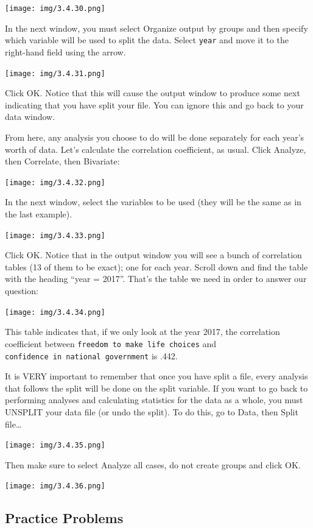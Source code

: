 \documentclass[]{book}
\begin{document}
\texttt{[image: img/3.4.30.png]}

In the next window, you must select {Organize output by groups} and then
specify which variable will be used to split the data. Select
\texttt{year} and move it to the right-hand field using the arrow.

\texttt{[image: img/3.4.31.png]}

Click {OK}. Notice that this will cause the output window to produce
some next indicating that you have split your file. You can ignore this
and go back to your data window.

From here, any analysis you choose to do will be done separately for
each year's worth of data. Let's calculate the correlation coefficient,
as usual. Click {Analyze}, then {Correlate}, then {Bivariate}:

\texttt{[image: img/3.4.32.png]}

In the next window, select the variables to be used (they will be the
same as in the last example).

\texttt{[image: img/3.4.33.png]}

Click {OK}. Notice that in the output window you will see a bunch of
correlation tables (13 of them to be exact); one for each year. Scroll
down and find the table with the heading ``year = 2017''. That's the
table we need in order to answer our question:

\texttt{[image: img/3.4.34.png]}

This table indicates that, if we only look at the year 2017, the
correlation coefficient between
\texttt{freedom\ to\ make\ life\ choices} and
\texttt{confidence\ in\ national\ government} is .442.

It is VERY important to remember that once you have split a file, every
analysis that follows the split will be done on the split variable. If
you want to go back to performing analyses and calculating statistics
for the data as a whole, you must UNSPLIT your data file (or undo the
split). To do this, go to {Data}, then {Split file\ldots{}}

\texttt{[image: img/3.4.35.png]}

Then make sure to select {Analyze all cases, do not create groups} and
click {OK}.

\texttt{[image: img/3.4.36.png]}

\subsection{Practice Problems}\label{practice-problems-2}
\end{document}
